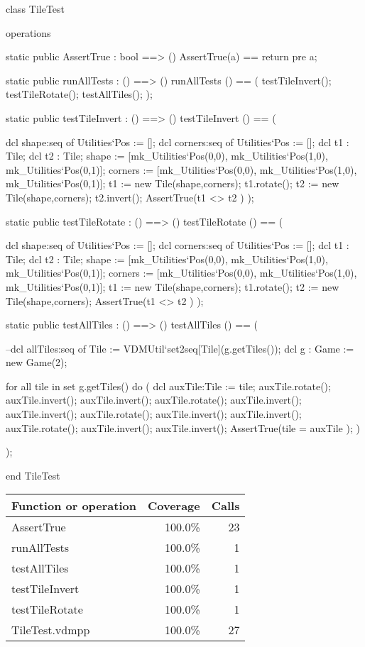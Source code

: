 \begin{vdm_al}
class TileTest

  operations
  
    static public AssertTrue : bool ==> ()
      AssertTrue(a) == return
      pre a;
      
    static public runAllTests : () ==> ()
    runAllTests () == (
      testTileInvert();
      testTileRotate();
      testAllTiles();
    );
    
    static public testTileInvert : () ==> ()
    testTileInvert () == (
    
      dcl shape:seq of Utilities`Pos := [];
        dcl corners:seq of Utilities`Pos := [];
        dcl t1 : Tile;
        dcl t2 : Tile;
      shape := [mk_Utilities`Pos(0,0), mk_Utilities`Pos(1,0), mk_Utilities`Pos(0,1)];
        corners := [mk_Utilities`Pos(0,0), mk_Utilities`Pos(1,0), mk_Utilities`Pos(0,1)];
      t1 := new Tile(shape,corners);
      t1.rotate();
      t2 := new Tile(shape,corners);
      t2.invert();
      AssertTrue(t1 <> t2 )
    );
    
    static public testTileRotate : () ==> ()
    testTileRotate () == (
    
      dcl shape:seq of Utilities`Pos := [];
        dcl corners:seq of Utilities`Pos := [];
        dcl t1 : Tile;
        dcl t2 : Tile;
      shape := [mk_Utilities`Pos(0,0), mk_Utilities`Pos(1,0), mk_Utilities`Pos(0,1)];
        corners := [mk_Utilities`Pos(0,0), mk_Utilities`Pos(1,0), mk_Utilities`Pos(0,1)];
      t1 := new Tile(shape,corners);
      t1.rotate();
      t2 := new Tile(shape,corners);
      AssertTrue(t1 <> t2 )
    );
    
    static public testAllTiles : () ==> ()
    testAllTiles () == (
    
      --dcl allTiles:seq of Tile := VDMUtil`set2seq[Tile](g.getTiles());
      dcl g : Game := new Game(2);
      
      for all tile in set g.getTiles() do (
        dcl auxTile:Tile := tile;
        auxTile.rotate();
        auxTile.invert();
        auxTile.invert();
        auxTile.rotate();
        auxTile.invert();
        auxTile.invert();
        auxTile.rotate();
        auxTile.invert();
        auxTile.invert();
        auxTile.rotate();
        auxTile.invert();
        auxTile.invert();
        AssertTrue(tile = auxTile );
      )
      
    );

end TileTest
\end{vdm_al}
\bigskip
\begin{longtable}{|l|r|r|}
\hline
Function or operation & Coverage & Calls \\
\hline
\hline
AssertTrue & 100.0\% & 23 \\
\hline
runAllTests & 100.0\% & 1 \\
\hline
testAllTiles & 100.0\% & 1 \\
\hline
testTileInvert & 100.0\% & 1 \\
\hline
testTileRotate & 100.0\% & 1 \\
\hline
\hline
TileTest.vdmpp & 100.0\% & 27 \\
\hline
\end{longtable}

